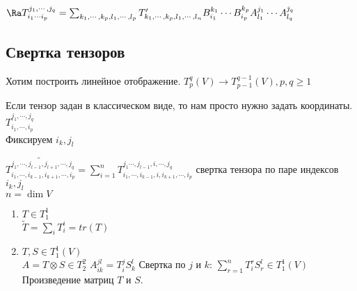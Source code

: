 $\Ra  T_{i_1 \cdots i_p}^{j_1, \cdots, j_q} = \sum_{k_1,\cdots, k_p, l_1, \cdots, l_p}T'_{k_1, \cdots, k_p, l_1, \cdots, l_n}B_{i_1}^{k_1} \cdots B_{i_p}^{k_p}A_{l_1}^{j_1} \cdots A_{l_q}^{j_q}$

\subsection{Свертка тензоров}
Хотим построить линейное отображение.
$T_{p}^{q}(V) \to T^{q - 1}_{p - 1}(V), p, q \ge 1$

Если тензор задан в классическом виде, то нам просто нужно задать координаты.
$T_{i_1, \cdots, i_p}^{j_1, \cdots, j_q}$\\
Фиксируем $i_k, j_l$\\
\begin{Def}
$\widetilde{T_{i_1, \cdots, i_{k - 1}, i_{k + 1}, \cdots, i_p}^{j_1, \cdots, j_{l - 1}, j_{l + 1}, \cdots, j_q}} = \sum_{i = 1}^{n}T_{i_1, \cdots, i_{k - 1}, i, i_{k + 1}, \cdots, i_p}^{j_1\cdots, j_{l - 1}, i, \cdots, j_{q}}$
свертка тензора по паре индексов $i_k, j_l$\\
$n = \dim V$\\
\end{Def}

\begin{exmp}\hfill
\begin{enumerate}
\item
$T \in T_{1}^{1}$\\
$\widetilde{T} = \sum_{i}T_{i}^{i} = tr(T)$  
\item
$T, S \in T_{1}^{1}(V)$\\
$A = T \otimes S \in T^2_2$
$A^{jl}_{ik} = T_i^jS_k^l$
Свертка по $j$ и $k$: $\sum_{r = 1}^{n}T_i^rS^l_r \in T^{1}_1(V)$
Произведение матриц $T$ и $S$.

\end{enumerate}
\end{exmp}